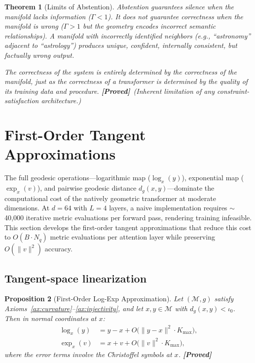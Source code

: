 \documentclass[11pt,a4paper]{article}
\newtheorem{theorem}{Theorem}[section]
\newtheorem{proposition}[theorem]{Proposition}
\theoremstyle{definition}
\theoremstyle{remark}
\newcommand{\statusproved}{\textcolor{green!50!black}{\textbf{[Proved]}}}
\begin{document}
\begin{theorem}[Limits of Abstention]\label{thm:limits}
Abstention guarantees silence when the manifold lacks information 
($\Gamma < 1$). It does \emph{not} guarantee correctness when the 
manifold is wrong ($\Gamma > 1$ but the geometry encodes incorrect 
semantic relationships). A manifold with incorrectly identified 
neighbors (e.g., ``astronomy'' adjacent to ``astrology'') produces 
unique, confident, internally consistent, but factually wrong output.

The correctness of the system is entirely determined by the 
correctness of the manifold, just as the correctness of a 
transformer is determined by the quality of its training data 
and procedure. \statusproved\ (Inherent limitation of any 
constraint-satisfaction architecture.)
\end{theorem}


\section{First-Order Tangent Approximations}\label{sec:tangent_approx}

The full geodesic operations---logarithmic map ($\log_x(y)$), 
exponential map ($\exp_x(v)$), and pairwise geodesic distance 
$d_g(x,y)$---dominate the computational cost of the natively 
geometric transformer at moderate dimensions. At $d = 64$ with 
$L = 4$ layers, a naive implementation requires $\sim$40{,}000 
iterative metric evaluations per forward pass, rendering training 
infeasible. This section develops the first-order tangent 
approximations that reduce this cost to $O(B \cdot N_q)$ metric 
evaluations per attention layer while preserving $O(\|v\|^2)$ 
accuracy.

\subsection{Tangent-space linearization}\label{sec:tangent_linear}

\begin{proposition}[First-Order Log-Exp Approximation]%
\label{prop:first_order}
Let $(\mathcal{M}, g)$ satisfy 
Axioms~\ref{ax:curvature}--\ref{ax:injectivity}, and let 
$x, y \in \mathcal{M}$ with $d_g(x,y) < \iota_0$. Then in 
normal coordinates at $x$:
\begin{align}
  \log_x(y) &= y - x + O\!\bigl(\|y - x\|^2 \cdot K_{\max}\bigr),
  \label{eq:log_approx} \\
  \exp_x(v) &= x + v + O\!\bigl(\|v\|^2 \cdot K_{\max}\bigr),
  \label{eq:exp_approx}
\end{align}
where the error terms involve the Christoffel symbols at $x$.
\statusproved
\end{proposition}
\end{document}
